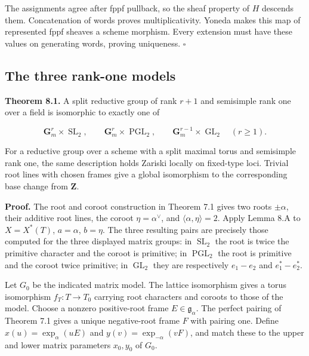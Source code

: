 \documentclass[11pt,a4paper,openany]{report}
\begin{document}
The assignments agree after fppf pullback, so the sheaf property of \(H\) descends them. Concatenation of words proves multiplicativity. Yoneda makes this map of represented fppf sheaves a scheme morphism. Every extension must have these values on generating words, proving uniqueness. \(\square\)

\subsection{The three rank-one models}\label{AG-RG-03-the-three-rank-one-models}

\textbf{Theorem 8.1.} A split reductive group of rank \(r+1\) and semisimple rank one over a field is isomorphic to exactly one of

\[
\mathbf G_m^r\times\operatorname{SL}_2,
\qquad
\mathbf G_m^r\times\operatorname{PGL}_2,
\qquad
\mathbf G_m^{r-1}\times\operatorname{GL}_2\quad(r\geq1).
\]

For a reductive group over a scheme with a split maximal torus and semisimple rank one, the same description holds Zariski locally on fixed-type loci. Trivial root lines with chosen frames give a global isomorphism to the corresponding base change from \(\mathbf Z\).

\textbf{Proof.} The root and coroot construction in Theorem 7.1 gives two roots \(\pm\alpha\), their additive root lines, the coroot \(\eta=\alpha^\vee\), and \(\langle\alpha,\eta\rangle=2\). Apply Lemma 8.A to \(X=X^*(T)\), \(a=\alpha\), \(b=\eta\). The three resulting pairs are precisely those computed for the three displayed matrix groups: in \(\operatorname{SL}_2\) the root is twice the primitive character and the coroot is primitive; in \(\operatorname{PGL}_2\) the root is primitive and the coroot twice primitive; in \(\operatorname{GL}_2\) they are respectively \(e_1-e_2\) and \(e_1^*-e_2^*\).

Let \(G_0\) be the indicated matrix model. The lattice isomorphism gives a torus isomorphism \(f_T:T\to T_0\) carrying root characters and coroots to those of the model. Choose a nonzero positive-root frame \(E\in\mathfrak g_\alpha\). The perfect pairing of Theorem 7.1 gives a unique negative-root frame \(F\) with pairing one. Define \(x(u)=\exp_\alpha(uE)\) and \(y(v)=\exp_{-\alpha}(vF)\), and match these to the upper and lower matrix parameters \(x_0,y_0\) of \(G_0\).
\end{document}
